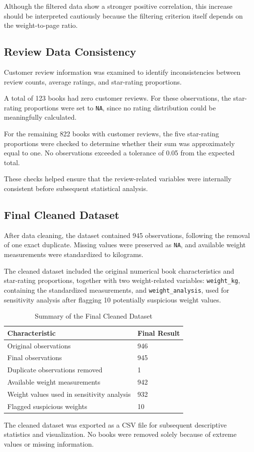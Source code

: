 \documentclass[11pt,a4paper]{article}
\begin{document}
Although the filtered data show a stronger positive
correlation, this increase should be interpreted
cautiously because the filtering criterion itself
depends on the weight-to-page ratio.

\subsection{Review Data Consistency}
Customer review information was examined to identify
inconsistencies between review counts, average ratings,
and star-rating proportions.

A total of 123 books had zero customer reviews. For
these observations, the star-rating proportions were
set to \texttt{NA}, since no rating distribution could
be meaningfully calculated.

For the remaining 822 books with customer reviews,
the five star-rating proportions were checked to
determine whether their sum was approximately equal
to one. No observations exceeded a tolerance of
0.05 from the expected total.

These checks helped ensure that the review-related
variables were internally consistent before
subsequent statistical analysis.

\subsection{Final Cleaned Dataset}

After data cleaning, the dataset contained 945 observations,
following the removal of one exact duplicate. Missing values
were preserved as \texttt{NA}, and available weight measurements
were standardized to kilograms.

The cleaned dataset included the original numerical book
characteristics and star-rating proportions, together with
two weight-related variables: \texttt{weight\_kg}, containing
the standardized measurements, and \texttt{weight\_analysis},
used for sensitivity analysis after flagging 10 potentially
suspicious weight values.

\begin{table}[H]
\centering
\begin{tabular}{ll}
\toprule
Characteristic & Final Result \\
\midrule
Original observations & 946 \\
Final observations & 945 \\
Duplicate observations removed & 1 \\
Available weight measurements & 942 \\
Weight values used in sensitivity analysis & 932 \\
Flagged suspicious weights & 10 \\
\bottomrule
\end{tabular}
\caption{Summary of the Final Cleaned Dataset}
\label{tab:cleaned}
\end{table}
The cleaned dataset was exported as a CSV file for
subsequent descriptive statistics and visualization.
No books were removed solely because of extreme values
or missing information.
\newpage
\end{document}
